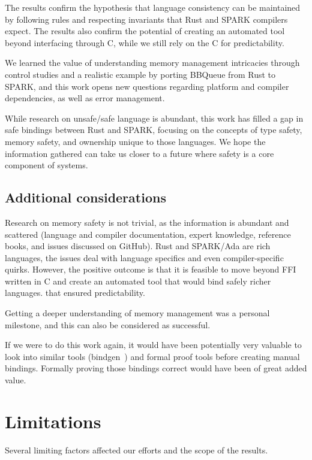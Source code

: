 \documentclass[nomenclature, english, bibtex]{kththesis}
\begin{document}
{The results confirm the hypothesis that language consistency can be maintained by following rules and respecting invariants that Rust and SPARK compilers expect. The results also confirm the potential of creating an automated tool beyond interfacing through C, while we still rely on the C  for predictability. 

We learned the value of understanding memory management intricacies through control studies and a realistic example by porting BBQueue from Rust to SPARK, and this work opens new questions regarding platform and compiler dependencies, as well as error management. 

While research on unsafe/safe language is abundant, this work has filled a gap in safe bindings between Rust and SPARK, focusing on the concepts of type safety, memory safety, and ownership unique to those languages. We hope the information gathered can take us closer to a future where safety is a core component of systems.

\subsection{Additional considerations}

Research on memory safety is not trivial, as the information is abundant and scattered (language and compiler documentation, expert knowledge, reference books, and issues discussed on GitHub). Rust and SPARK/Ada are rich languages, the issues deal with language specifics and even compiler-specific quirks. However, the positive outcome is that it is feasible to move beyond \gls{FFI} written in C and create an automated tool that would bind safely richer languages. that ensured predictability. 

Getting a deeper understanding of memory management was a personal milestone, and this can also be considered as successful.

If we were to do this work again, it would have been potentially very valuable to look into similar tools (bindgen~\cite{noauthor_bindgen_2022}) and formal proof tools before creating manual bindings. Formally proving those bindings correct would have been of great added value.

\section{Limitations}
\label{sec:limitations}

Several limiting factors affected our efforts and the scope of the results.

}
\end{document}
